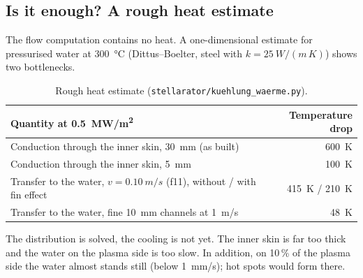 \documentclass[10pt,a4paper]{article}
\begin{document}
\subsection{Is it enough? A rough heat estimate}
The flow computation contains no heat. A one-dimensional estimate for pressurised water at \SI{300}{\celsius}
(Dittus--Boelter, steel with $k=\SI{25}{W/(m\,K)}$) shows two bottlenecks.
\begin{table}[H]\centering\small
\begin{tabular}{@{}lr@{}}\toprule
Quantity at \SI{0.5}{MW/m^2} & Temperature drop \\\midrule
Conduction through the inner skin, \SI{30}{mm} (as built) & \SI{600}{K} \\
Conduction through the inner skin, \SI{5}{mm} & \SI{100}{K} \\
Transfer to the water, $v=\SI{0.10}{m/s}$ (f11), without / with fin effect & \SI{415}{K} / \SI{210}{K} \\
Transfer to the water, fine \SI{10}{mm} channels at \SI{1}{m/s} & \SI{48}{K} \\\bottomrule
\end{tabular}\caption{Rough heat estimate (\texttt{stellarator/kuehlung\_waerme.py}).}\end{table}
The distribution is solved, the cooling is not yet. The inner skin is far too thick and the water on the plasma
side is too slow. In addition, on 10\,\% of the plasma side the water almost stands still (below
\SI{1}{mm/s}); hot spots would form there.
\end{document}
